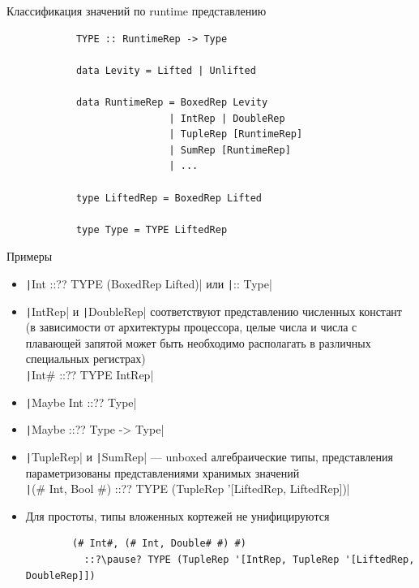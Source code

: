     \begin{frame}[fragile]{Классификация значений по runtime представлению}
        \pause
        \begin{verbatim}
            TYPE :: RuntimeRep -> Type

            data Levity = Lifted | Unlifted

            data RuntimeRep = BoxedRep Levity
                            | IntRep | DoubleRep
                            | TupleRep [RuntimeRep]
                            | SumRep [RuntimeRep]
                            | ...

            type LiftedRep = BoxedRep Lifted

            type Type = TYPE LiftedRep
        \end{verbatim}
    \end{frame}

    \begin{frame}[fragile]{Примеры}
        \pause
        \begin{itemize}
            \item \texttt|Int ::?\pause? TYPE (BoxedRep Lifted)| или \texttt|:: Type|
            \item \texttt|IntRep| и \texttt|DoubleRep| соответствуют представлению численных констант (в зависимости от архитектуры процессора, целые числа и числа с плавающей запятой может быть необходимо располагать в различных специальных регистрах)\\ \texttt|Int# ::?\pause? TYPE IntRep|
            \item \texttt|Maybe Int ::?\pause? Type|
            \item \texttt|Maybe ::?\pause? Type -> Type|
            \item \texttt|TupleRep| и \texttt|SumRep| --- unboxed алгебраические типы, представления параметризованы представлениями хранимых значений\\
            \texttt|(# Int, Bool #) ::?\pause? TYPE (TupleRep '[LiftedRep, LiftedRep])|
            \item Для простоты, типы вложенных кортежей не унифицируются
            \begin{verbatim}
        (# Int#, (# Int, Double# #) #)
          ::?\pause? TYPE (TupleRep '[IntRep, TupleRep '[LiftedRep, DoubleRep]])
            \end{verbatim}
        \end{itemize}
    \end{frame}

